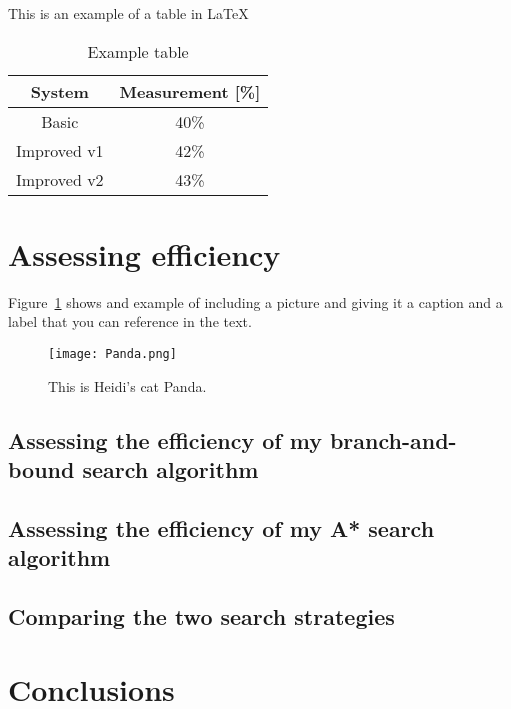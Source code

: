 \documentclass[11pt,oneside]{article}
\begin{document}
This is an example of a table in \LaTeX

\begin{table}[ht]
    \centering
    \begin{tabular}{|c|c|}
        System      & Measurement [\%] \\ \hline
        Basic       & 40\% \\
        Improved v1 & 42\% \\
        Improved v2 & 43\% \\
    \end{tabular}
    \caption{Example table}
    \label{tab:my_label}
\end{table}

\section{Assessing efficiency}

Figure~\ref{fig:panda} shows and example of including a picture and giving it a caption and a label that you can reference in the text.

\begin{figure}[ht]
\centering
  \texttt{[image: Panda.png]}
  \caption{This is Heidi's cat Panda.}
  \label{fig:panda}
 \end{figure} 
 
\subsection{Assessing the efficiency of my branch-and-bound search algorithm}

\subsection{Assessing the efficiency of my A* search algorithm}

\subsection{Comparing the two search strategies}

\section{Conclusions}
\end{document}
